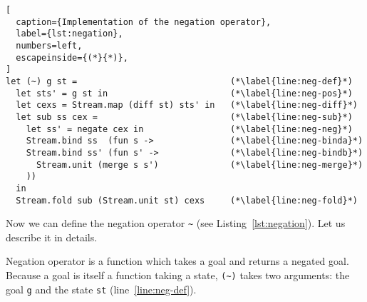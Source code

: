 \begin{minipage}[htb]{\textwidth}
\begin{lstlisting}[
  caption={Implementation of the negation operator},
  label={lst:negation},
  numbers=left,
  escapeinside={(*}{*)},
]
let (~) g st =                              (*\label{line:neg-def}*)
  let sts' = g st in                        (*\label{line:neg-pos}*)
  let cexs = Stream.map (diff st) sts' in   (*\label{line:neg-diff}*)
  let sub ss cex =                          (*\label{line:neg-sub}*)
    let ss' = negate cex in                 (*\label{line:neg-neg}*)
    Stream.bind ss  (fun s ->               (*\label{line:neg-binda}*)
    Stream.bind ss' (fun s' ->              (*\label{line:neg-bindb}*)
      Stream.unit (merge s s')              (*\label{line:neg-merge}*)
    ))
  in 
  Stream.fold sub (Stream.unit st) cexs     (*\label{line:neg-fold}*)
\end{lstlisting}
\end{minipage}

Now we can define the negation operator \lstinline{~} (see Listing~\ref{lst:negation}).
Let us describe it in details.

Negation operator is a function which takes
a goal and returns a negated goal.
Because a goal is itself a function taking a state,
\lstinline{(~)} takes two arguments:
the goal \lstinline{g} and the state \lstinline{st}
(line~\ref{line:neg-def}).

